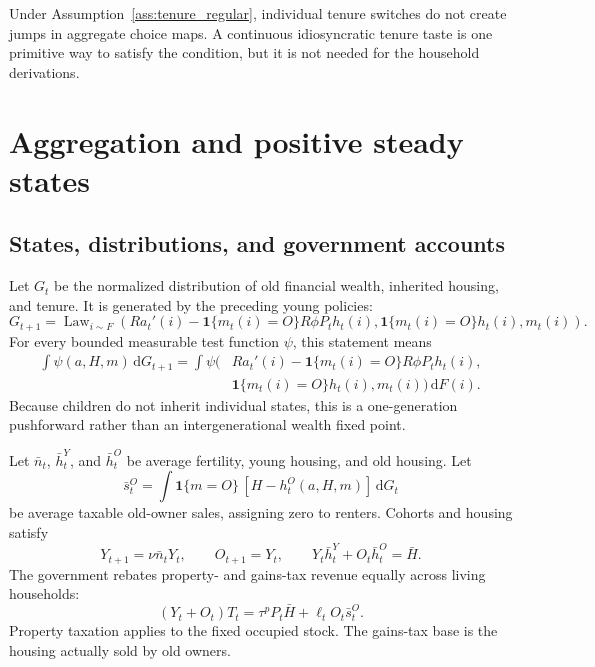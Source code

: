 \documentclass[11pt]{article}
\theoremstyle{definition}
\theoremstyle{remark}
\newcommand{\dd}{\mathrm d}
\newcommand{\ind}{\mathbf 1}
\begin{document}
Under Assumption~\ref{ass:tenure_regular}, individual tenure switches do not
create jumps in aggregate choice maps.  A continuous idiosyncratic tenure taste
is one primitive way to satisfy the condition, but it is not needed for the
household derivations.

\section{Aggregation and positive steady states}

\subsection{States, distributions, and government accounts}

Let $G_t$ be the normalized distribution of old financial wealth, inherited
housing, and tenure.  It is generated by the preceding young policies:
\begin{equation}
 G_{t+1}=\operatorname{Law}_{i\sim F}\!\left(
 Ra_t'(i)-\ind\{m_t(i)=O\}R\phi P_th_t(i),
 \ind\{m_t(i)=O\}h_t(i),m_t(i)\right).
 \label{eq:G_pushforward_app}
\end{equation}
For every bounded measurable test function $\psi$, this statement means
\begin{align}
 \int\psi(a,H,m)\,\dd G_{t+1}
 =\int \psi\big(&Ra_t'(i)-\ind\{m_t(i)=O\}R\phi P_th_t(i),
 \nonumber\\[-4pt]
 &\ind\{m_t(i)=O\}h_t(i),m_t(i)\big)\,\dd F(i).
 \label{eq:G_test_app}
\end{align}
Because children do not inherit individual states, this is a one-generation
pushforward rather than an intergenerational wealth fixed point.

Let $\bar n_t$, $\bar h_t^Y$, and $\bar h_t^O$ be average fertility, young
housing, and old housing.  Let
\begin{equation}
 \bar s_t^O=\int \ind\{m=O\}\,[H-h_t^O(a,H,m)]\,\dd G_t
 \label{eq:old_sales_app}
\end{equation}
be average taxable old-owner sales, assigning zero to renters.  Cohorts and
housing satisfy
\begin{equation}
 Y_{t+1}=\nu\bar n_tY_t,\qquad O_{t+1}=Y_t,\qquad
 Y_t\bar h_t^Y+O_t\bar h_t^O=\bar H.
 \label{eq:aggregate_laws_app}
\end{equation}
The government rebates property- and gains-tax revenue equally across living
households:
\begin{equation}
 (Y_t+O_t)T_t=\tau^pP_t\bar H+\ell_tO_t\bar s_t^O.
 \label{eq:gov_app}
\end{equation}
Property taxation applies to the fixed occupied stock.  The gains-tax base is
the housing actually sold by old owners.
\end{document}
